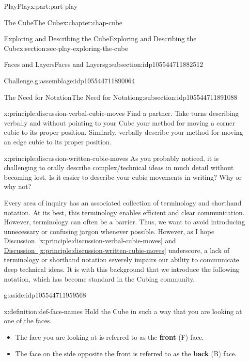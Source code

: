\documentclass[oneside,10pt,]{book}
\newcommand{\xreffont}{\relax}
\newcommand{\terminology}[1]{\textbf{#1}}
\numberwithin{equation}{section}
\begin{document}
\begin{partptx}{Play}{}{Play}{}{}{x:part:part-play}
\begin{chapterptx}{The Cube}{}{The Cube}{}{}{x:chapter:chap-cube}
\begin{sectionptx}{Exploring and Describing the Cube}{}{Exploring and Describing the Cube}{}{}{x:section:sec-play-exploring-the-cube}
\begin{subsectionptx}{Faces and Layers}{}{Faces and Layers}{}{}{g:subsection:idp105544711882512}
\begin{assemblage}{Challenge.}{g:assemblage:idp105544711890064}
\end{assemblage}
\end{subsectionptx}
%
%
\typeout{************************************************}
\typeout{************************************************}
%
\begin{subsectionptx}{The Need for Notation}{}{The Need for Notation}{}{}{g:subsection:idp105544711891088}
\begin{principle}{}{}{x:principle:discussion-verbal-cubie-moves}%
Find a partner. Take turns describing verbally and without pointing to your Cube your method for moving a corner cubie to its proper position. Similarly, verbally describe your method for moving an edge cubie to its proper position.%
\end{principle}
\begin{principle}{}{}{x:principle:discussion-written-cubie-moves}%
As you probably noticed, it is challenging to orally describe complex\slash{}technical ideas in much detail without becoming lost. Is it easier to describe your cubie movements in writing? Why or why not?%
\end{principle}
Every area of inquiry has an associated collection of terminology and shorthand notation. At its best, this terminology enables efficient and clear communication. However, terminology can often be a barrier. Thus, we want to avoid introducing unnecessary or confusing jargon whenever possible. However, as I hope \hyperref[x:principle:discussion-verbal-cubie-moves]{Discussion~{\xreffont\ref{x:principle:discussion-verbal-cubie-moves}}} and \hyperref[x:principle:discussion-written-cubie-moves]{Discussion~{\xreffont\ref{x:principle:discussion-written-cubie-moves}}} underscore, a lack of terminology or shorthand notation severely impairs our ability to communicate deep technical ideas. It is with this background that we introduce the following notation, which has become standard in the Cubing community.\begin{aside}{}{g:aside:idp105544711959568}%
\end{aside}
%
\begin{definition}{}{x:definition:def-face-names}%
Hold the Cube in such a way that you are looking at one of the faces.%
\begin{itemize}[label=\textbullet]
\item{}The face you are looking at is referred to as the \terminology{front} (F) face.%
\item{}The face on the side opposite the front is referred to as the \terminology{back} (B) face.%

\end{itemize}
\end{definition}
\end{subsectionptx}
\end{sectionptx}
\end{chapterptx}
\end{partptx}
\end{document}
